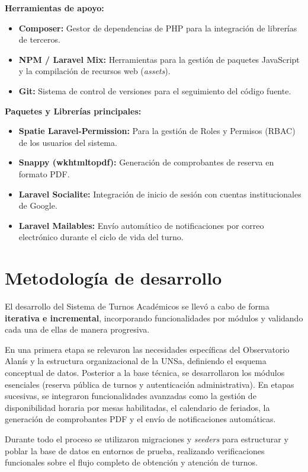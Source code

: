 \textbf{Herramientas de apoyo:}
\begin{itemize}
    \item \textbf{Composer:} Gestor de dependencias de PHP para la integración de librerías de terceros.
    \item \textbf{NPM / Laravel Mix:} Herramientas para la gestión de paquetes JavaScript y la compilación de recursos web (\textit{assets}).
    \item \textbf{Git:} Sistema de control de versiones para el seguimiento del código fuente.
\end{itemize}

\textbf{Paquetes y Librerías principales:}
\begin{itemize}
    \item \textbf{Spatie Laravel-Permission:} Para la gestión de Roles y Permisos (RBAC) de los usuarios del sistema.
    \item \textbf{Snappy (wkhtmltopdf):} Generación de comprobantes de reserva en formato PDF.
    \item \textbf{Laravel Socialite:} Integración de inicio de sesión con cuentas institucionales de Google.
    \item \textbf{Laravel Mailables:} Envío automático de notificaciones por correo electrónico durante el ciclo de vida del turno.
\end{itemize}

\section{Metodología de desarrollo}
El desarrollo del Sistema de Turnos Académicos se llevó a cabo de forma \textbf{iterativa e incremental}, incorporando funcionalidades por módulos y validando cada una de ellas de manera progresiva.

En una primera etapa se relevaron las necesidades específicas del Observatorio Alanís y la estructura organizacional de la UNSa, definiendo el esquema conceptual de datos. Posterior a la base técnica, se desarrollaron los módulos esenciales (reserva pública de turnos y autenticación administrativa). En etapas sucesivas, se integraron funcionalidades avanzadas como la gestión de disponibilidad horaria por mesas habilitadas, el calendario de feriados, la generación de comprobantes PDF y el envío de notificaciones automáticas.

Durante todo el proceso se utilizaron migraciones y \textit{seeders} para estructurar y poblar la base de datos en entornos de prueba, realizando verificaciones funcionales sobre el flujo completo de obtención y atención de turnos.
